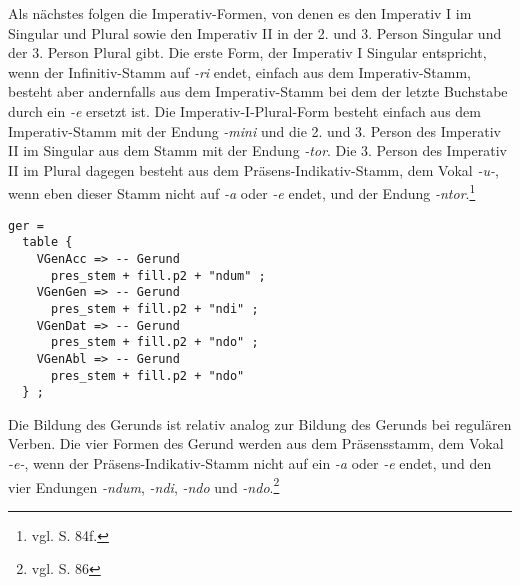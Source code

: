 Als nächstes folgen die Imperativ-Formen, von denen es den Imperativ I im Singular und Plural sowie den Imperativ II in der 2. und 3. Person Singular und der 3. Person Plural gibt. Die erste Form, der Imperativ I Singular entspricht, wenn der Infinitiv-Stamm auf \textit{-ri} endet, einfach aus dem Imperativ-Stamm, besteht aber andernfalls  aus dem Imperativ-Stamm bei dem der letzte Buchstabe durch ein \textit{-e} ersetzt ist. Die Imperativ-I-Plural-Form besteht einfach aus dem Imperativ-Stamm mit der Endung \textit{-mini} und die 2. und 3. Person des Imperativ II im Singular aus dem Stamm mit der Endung \textit{-tor}. Die 3. Person des Imperativ II im Plural dagegen besteht aus dem Präsens-Indikativ-Stamm, dem Vokal \textit{-u-}, wenn eben dieser Stamm nicht auf \textit{-a} oder \textit{-e} endet, und der Endung \textit{-ntor}.\footnote{vgl. \cite{BAYER-LINDAUER1994} S. 84f.} \par
\begin{lstlisting}[float=h!tp,caption={Ausschnitt aus der Funktion \texttt{mkDeponent} um Gerund-Verbformen zu bilden (vgl. \textbf{ResLat.gf})},label={GF-Res-MkDeponent-Ger},basicstyle=\small]
ger = 
  table {
    VGenAcc => -- Gerund
      pres_stem + fill.p2 + "ndum" ;
    VGenGen => -- Gerund
      pres_stem + fill.p2 + "ndi" ;
    VGenDat => -- Gerund
      pres_stem + fill.p2 + "ndo" ;
    VGenAbl => -- Gerund
      pres_stem + fill.p2 + "ndo" 
  } ;
\end{lstlisting}
Die Bildung des Gerunds ist relativ analog zur Bildung des Gerunds bei regulären Verben. Die vier Formen des Gerund werden aus dem Präsensstamm, dem Vokal \textit{-e-}, wenn der Präsens-Indikativ-Stamm nicht auf ein \textit{-a} oder \textit{-e} endet, und den vier Endungen \textit{-ndum}, \textit{-ndi}, \textit{-ndo} und \textit{-ndo}.\footnote{vgl. \cite{BAYER-LINDAUER1994} S. 86} \par
